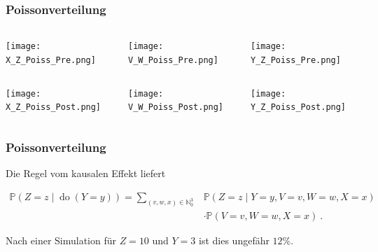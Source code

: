\documentclass{beamer}
\newcommand{\Do}{\operatorname{do}}
\begin{document}
\begin{frame}
\frametitle{Poissonverteilung}

\begin{columns}
\begin{column}{0.33\linewidth}
\begin{center}
	\texttt{[image: X\_Z\_Poiss\_Pre.png]}
\end{center}
\end{column}
\begin{column}{0.33\linewidth}
\begin{center}
	\texttt{[image: V\_W\_Poiss\_Pre.png]}
\end{center}
\end{column}
\begin{column}{0.33\linewidth}
\begin{center}
	\texttt{[image: Y\_Z\_Poiss\_Pre.png]}
\end{center}
\end{column}
\end{columns}

\begin{columns}
\begin{column}{0.33\linewidth}
\begin{center}
	\texttt{[image: X\_Z\_Poiss\_Post.png]}
\end{center}
\end{column}
\begin{column}{0.33\linewidth}
\begin{center}
	\texttt{[image: V\_W\_Poiss\_Post.png]}
\end{center}
\end{column}
\begin{column}{0.33\linewidth}
\begin{center}
	\texttt{[image: Y\_Z\_Poiss\_Post.png]}
\end{center}
\end{column}
\end{columns}
\end{frame}

\begin{frame}
\frametitle{Poissonverteilung}

Die Regel vom kausalen Effekt liefert
\begin{small}
\begin{align*}
\mathbb{P}(Z = z \mid \Do(Y = y)) = \sum_{(v, w, x) \in \mathbb{N}_0^3}& \mathbb{P}(Z = z \mid Y = y, V = v, W = w, X = x)\\
&\cdot \mathbb{P}(V = v, W = w, X = x)~.
\end{align*}
\end{small}

Nach einer Simulation für $Z = 10$ und $Y = 3$ ist dies ungefähr $12 \%$.
\end{frame}
\end{document}
